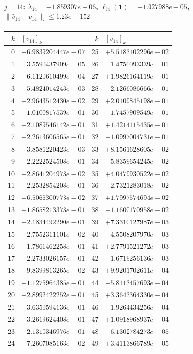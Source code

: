 \documentclass[11pt]{article}
\begin{document}
\paragraph{$j = 14$: $\lambda_{14} = -1.859307e-06$, \quad $\ell_{14}(\mathbf{1}) = +1.027988e-05$, \quad $\|\hat{v}_{14} - v_{14}\|_2 \leq 1.23e-152$}
\begin{center}
{\footnotesize
\begin{tabular}{r@{\;\;}l@{\quad}r@{\;\;}l}
\toprule
$k$ & $[v_{14}]_k$ & $k$ & $[v_{14}]_k$ \\
\midrule
0 & $+6.9839204447e-07$ & 25 & $+5.5183102296e-02$ \\
1 & $+3.5590437909e-05$ & 26 & $-1.4750093339e-01$ \\
2 & $+6.1120610499e-04$ & 27 & $+1.9826164119e-01$ \\
3 & $+5.4824014243e-03$ & 28 & $-2.1266086666e-01$ \\
4 & $+2.9643512430e-02$ & 29 & $+2.0109845198e-01$ \\
5 & $+1.0100817539e-01$ & 30 & $-1.7457909549e-01$ \\
6 & $+2.1089546142e-01$ & 31 & $+1.4214115435e-01$ \\
7 & $+2.2613606565e-01$ & 32 & $-1.0997004731e-01$ \\
8 & $+3.8586220423e-03$ & 33 & $+8.1561628605e-02$ \\
9 & $-2.2222524508e-01$ & 34 & $-5.8359654245e-02$ \\
10 & $-2.8641204973e-02$ & 35 & $+4.0479930522e-02$ \\
11 & $+2.2532854208e-01$ & 36 & $-2.7321283018e-02$ \\
12 & $-6.5066300773e-02$ & 37 & $+1.7997574694e-02$ \\
13 & $-1.8658213373e-01$ & 38 & $-1.1600170958e-02$ \\
14 & $+2.1834492290e-01$ & 39 & $+7.3310127987e-03$ \\
15 & $-2.7552311101e-02$ & 40 & $-4.5508207970e-03$ \\
16 & $-1.7861462258e-01$ & 41 & $+2.7791521272e-03$ \\
17 & $+2.2733026157e-01$ & 42 & $-1.6719256136e-03$ \\
18 & $-9.8399813265e-02$ & 43 & $+9.9201702611e-04$ \\
19 & $-1.1276964385e-01$ & 44 & $-5.8113457693e-04$ \\
20 & $+2.8992422252e-01$ & 45 & $+3.3643364330e-04$ \\
21 & $-3.6350594136e-01$ & 46 & $-1.9264434256e-04$ \\
22 & $+3.2619624408e-01$ & 47 & $+1.0918968937e-04$ \\
23 & $-2.1310346976e-01$ & 48 & $-6.1302784273e-05$ \\
24 & $+7.2607085163e-02$ & 49 & $+3.4113866789e-05$ \\
\bottomrule
\end{tabular}
}
\end{center}
\end{document}
